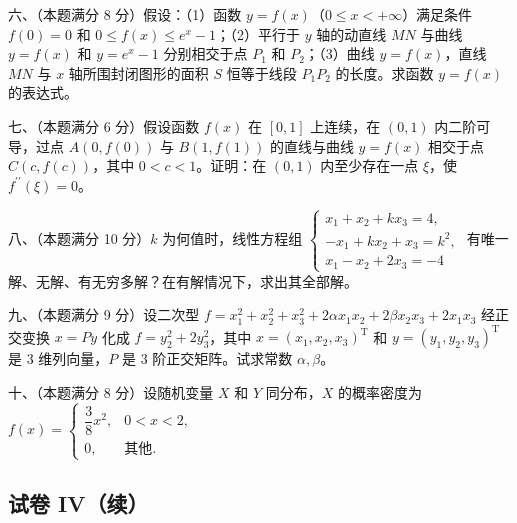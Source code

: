 \documentclass[UTF8,12pt]{ctexart}
\begin{document}
六、（本题满分 8 分）假设：（1）函数 \(\displaystyle y=f(x)\)（\(\displaystyle 0\leq x<+\infty\)）满足条件 \(\displaystyle f(0)=0\) 和 \(\displaystyle 0\leq f(x)\leq e^x-1\)；（2）平行于 \(\displaystyle y\) 轴的动直线 \(\displaystyle MN\) 与曲线 \(\displaystyle y=f(x)\) 和 \(\displaystyle y=e^x-1\) 分别相交于点 \(\displaystyle P_1\) 和 \(\displaystyle P_2\)；（3）曲线 \(\displaystyle y=f(x)\)，直线 \(\displaystyle MN\) 与 \(\displaystyle x\) 轴所围封闭图形的面积 \(\displaystyle S\) 恒等于线段 \(\displaystyle P_1P_2\) 的长度。求函数 \(\displaystyle y=f(x)\) 的表达式。


七、（本题满分 6 分）假设函数 \(\displaystyle f(x)\) 在 \(\displaystyle [0,\allowbreak 1]\) 上连续，在 \(\displaystyle (0,\allowbreak 1)\) 内二阶可导，过点 \(\displaystyle A(0,\allowbreak f(0))\) 与 \(\displaystyle B(1,\allowbreak f(1))\) 的直线与曲线 \(\displaystyle y=f(x)\) 相交于点 \(\displaystyle C(c,\allowbreak f(c))\)，其中 \(\displaystyle 0<c<1\)。证明：在 \(\displaystyle (0,\allowbreak 1)\) 内至少存在一点 \(\displaystyle \xi\)，使 \(\displaystyle f^{\prime\prime}(\xi)=0\)。


八、（本题满分 10 分）\(\displaystyle k\) 为何值时，线性方程组 \(\displaystyle \begin{cases}x_1+x_2+kx_3=4,\allowbreak \\-x_1+kx_2+x_3=k^2,\allowbreak \\x_1-x_2+2x_3=-4\end{cases}\) 有唯一解、无解、有无穷多解？在有解情况下，求出其全部解。


九、（本题满分 9 分）设二次型 \(\displaystyle f=x_1^2+x_2^2+x_3^2+2\alpha x_1x_2+2\beta x_2x_3+2x_1x_3\) 经正交变换 \(\displaystyle x=Py\) 化成 \(\displaystyle f=y_2^2+2y_3^2\)，其中 \(\displaystyle x=(x_1,\allowbreak x_2,\allowbreak x_3)^{\mathrm T}\) 和 \(\displaystyle y=(y_1,\allowbreak y_2,\allowbreak y_3)^{\mathrm T}\) 是 3 维列向量，\(\displaystyle P\) 是 3 阶正交矩阵。试求常数 \(\displaystyle \alpha,\allowbreak \beta\)。


十、（本题满分 8 分）设随机变量 \(\displaystyle X\) 和 \(\displaystyle Y\) 同分布，\(\displaystyle X\) 的概率密度为 \(\displaystyle f(x)=\begin{cases}\dfrac{\displaystyle 3}{\displaystyle 8}x^2,\allowbreak &0<x<2,\allowbreak \\0,\allowbreak &\text{其他}.\end{cases}\)


\subsection*{试卷 IV（续）}
\end{document}
